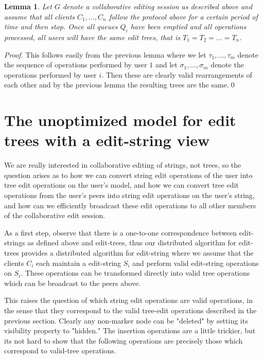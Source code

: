\documentclass{amsart}
\newtheorem{lemma}[theorem]{Lemma}
\begin{document}
\begin{lemma}
Let $G$ denote a collaborative editing session as described
above and assume that all clients $C_1,\ldots,C_n$ follow the protocol above
for a certain period of time and then stop. Once all queues $Q_i$ have been
emptied and all operations processed, all users will have the same edit
trees, that is $T_1=T_2=\ldots=T_n$.
\end{lemma}

\begin{proof}
This follows easily from the previous lemma where we let $\tau_1,\ldots,\tau_m$
denote the sequence of operations performed by user $1$ and let 
$\sigma_1,\ldots,\sigma_m$ denote the operations performed by user $i$. Then
these are clearly valid rearrangements of each other and by the previous
lemma the resulting trees are the same.\qed
\end{proof}


\newpage
\section{The unoptimized model for edit trees with a edit-string view}
We are really interested in collaborative editing of strings, not trees, so the
question arises as to how we can convert string edit operations of the user
into tree edit operations on the user's model, and how we can convert tree edit
operations from the user's peers into string edit operations on the user's string,
and how can we efficiently broadcast these edit operations to all other members
of the collaborative edit session.

As a first step, observe that there is a one-to-one correspondence between
edit-strings as defined above and edit-trees, thus our distributed algorithm
for edit-trees provides a distributed algorithm for edit-string where we
assume that the clients $C_i$ each maintain a edit-string $S_i$ and perform valid
edit-string operations on $S_i$. These operations can be transformed directly
into valid tree operations which can be broadcast to the peers above. 

This raises the question of which string edit operations are valid operations,
in the sense that they correspond to the valid tree-edit operations described
in the previous section.  Clearly any non-marker node can be "deleted" by setting
its visibility property to "hidden."  The insertion operations are a little
trickier, but its not hard to show that the following operations are precisely
those which correspond to valid-tree operations. 
\end{document}
